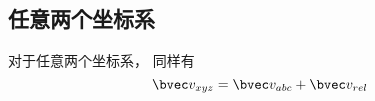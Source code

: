 

\subsection{任意两个坐标系}
对于任意两个坐标系， 同样有
\begin{equation}
\bvec v_{xyz} = \bvec v_{abc} + \bvec v_{rel}
\end{equation}
